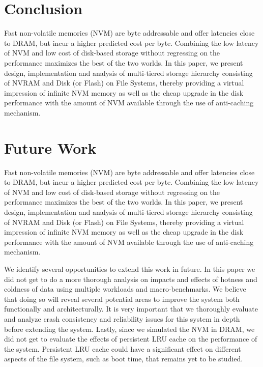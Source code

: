 \section{Conclusion}
\label{sec-conc}

Fast non-volatile memories (NVM) are byte addressable and offer latencies close to DRAM, but incur a higher predicted cost per byte. Combining the low latency of NVM and low cost of disk-based storage without regressing on the performance maximizes the best of the two worlds. In this paper, we present design, implementation and analysis of multi-tiered storage hierarchy consisting of NVRAM and Disk (or Flash) on File Systems, thereby providing a virtual impression of infinite NVM memory as well as the cheap upgrade in the disk performance with the amount of NVM available through the use of anti-caching mechanism.


\section{Future Work}
\label{sec-conc}

Fast non-volatile memories (NVM) are byte addressable and offer latencies close to DRAM, but incur a higher predicted cost per byte. Combining the low latency of NVM and low cost of disk-based storage without regressing on the performance maximizes the best of the two worlds. In this paper, we present design, implementation and analysis of multi-tiered storage hierarchy consisting of NVRAM and Disk (or Flash) on File Systems, thereby providing a virtual impression of infinite NVM memory as well as the cheap upgrade in the disk performance with the amount of NVM available through the use of anti-caching mechanism.

We identify several opportunities to extend this work in future. In this paper we did not get to do a more thorough analysis on impacts and effects of hotness and coldness of data using multiple workloads and macro-benchmarks. We believe that doing so will reveal several potential areas to improve the system both functionally and architecturally. It is very important that we thoroughly evaluate and analyze crash consistency and reliability issues for this system in depth before extending the system. Lastly, since we simulated the NVM in DRAM, we did not get to evaluate the effects of persistent LRU cache on the performance of the system. Persistent LRU cache could have a significant effect on different aspects of the file system, such as boot time, that remains yet to be studied.
